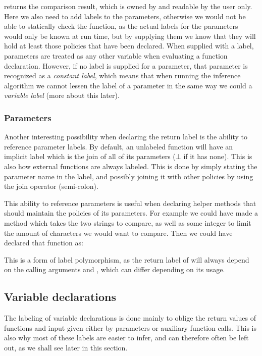  returns the comparison result, which is owned by and readable by the user only.
Here we also need to add labels to the parameters, otherwise we would not be able to statically check the function, as the actual labels for the parameters would only be known at run time, but by supplying them we know that they will hold at least those policies that have been declared.
When supplied with a label, parameters are treated as any other variable when evaluating a function declaration.
However, if no label is supplied for a parameter, that parameter is recognized as a \emph{constant label}, which means that when running the inference algorithm we cannot lessen the label of a parameter in the same way we could a \emph{variable label} (more about this later).

\subsubsection{Parameters}
Another interesting possibility when declaring the return label is the ability to reference parameter labels.
By default, an unlabeled function will have an implicit label which is the join of all of its parameters ($\bot$ if it has none).
This is also how external functions are always labeled.
This is done by simply stating the parameter name in the label, and possibly joining it with other policies by using the join operator (semi-colon).

This ability to reference parameters is useful when declaring helper methods that should maintain the policies of its parameters.
For example we could have made a  method which takes the two strings to compare, as well as some integer to limit the amount of characters we would want to compare.
Then we could have declared that function as: \\
\begin{minipage}{\linewidth}
  \centering
\end{minipage}

This is a form of label polymorphism, as the return label of  will always depend on the calling arguments  and , which can differ depending on its usage.

\subsection{Variable declarations}
The labeling of variable declarations is done mainly to oblige the return values of functions and input given either by parameters or auxiliary function calls.
This is also why most of these labels are easier to infer, and can therefore often be left out, as we shall see later in this section.

